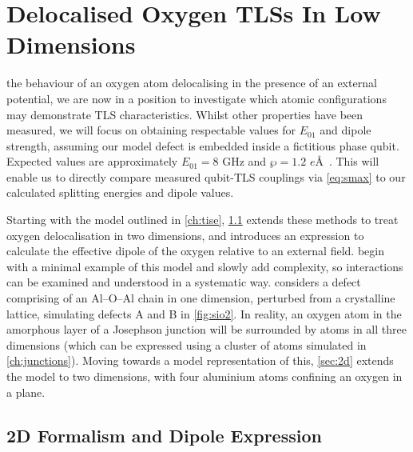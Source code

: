 \versoquote{\raisebox{-1.5em}{\resizebox{!}{2.15em}{}}}{\raisebox{-0.7em}{\resizebox{!}{1.7em}{}}}
\chapter[Delocalised Oxygen TLSs In Low Dimensions][TLSs In Low Dimensions]{Delocalised Oxygen TLSs In Low Dimensions}\label{ch:tlslow}

 the behaviour of an oxygen atom delocalising in the presence of an external potential, we are now in a position to investigate which atomic configurations may demonstrate TLS characteristics.
Whilst other properties have been measured, we will focus on obtaining respectable values for $E_{01}$ and dipole strength, assuming our model defect is embedded inside a fictitious phase qubit.
Expected values are approximately $E_{01}=8$ GHz and $\wp=1.2$ $e$\AA~\cite{Cole2010}.
This will enable us to directly compare measured qubit-TLS couplings via \cref{eq:smax} to our calculated splitting energies and dipole values.

Starting with the model outlined in \cref{ch:tise}, \cref{sec:methdipole} extends these methods to treat oxygen delocalisation in two dimensions, and introduces an expression to calculate the effective dipole of the oxygen relative to an external field.
 begin with a minimal example of this model and slowly add complexity, so interactions can be examined and understood in a systematic way.
 considers a defect comprising of an Al--O--Al chain in one dimension, perturbed from a crystalline lattice, simulating defects A and B in \cref{fig:sio2}.
In reality, an oxygen atom in the amorphous layer of a Josephson junction will be surrounded by atoms in all three dimensions (which can be expressed using a cluster of atoms simulated in \cref{ch:junctions}).
Moving towards a model representation of this, \cref{sec:2d} extends the model to two dimensions, with four aluminium atoms confining an oxygen in a plane.

\section[\lin{2D} Formalism and Dipole Expression]{2D Formalism and Dipole Expression}\label{sec:methdipole}

